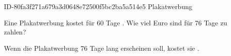 \begin{exercise}
      {ID-80fa3f271a679a3d0648e72500f5bc2ba5a514e5}
      {Plakatwerbung}
  \ifproblem\problem\par
    Eine Plakatwerbung kostet für \num{60} Tage .
    Wie viel Euro sind für \num{76} Tage zu zahlen?
  \fi
  \ifoutcome\outcome\par
    Wenn die Plakatwerbung \num{76} Tage lang erscheinen soll, kostet sie .
  \fi
\end{exercise}
